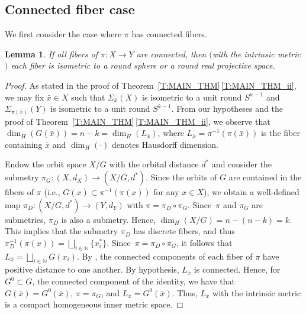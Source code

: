 \documentclass[10pt,a4paper]{amsart}
\numberwithin{equation}{section}
\newtheorem{lem}[thm]{Lemma}
\theoremstyle{definition}
\newcommand{\N}{\mathbb{N}} %
\begin{document}
\subsection*{Connected fiber case} We first consider the case where $\pi$ has connected fibers.

\begin{lem}\label{L: fibers are homogeneous Riemannian manifolds}
If all fibers of $\pi\colon X\to Y$ are connected, then $($with the intrinsic metric$)$ each fiber is isometric to a round sphere or a round real projective space.
\end{lem}

\begin{proof}

As stated in the proof of Theorem~\ref{T:MAIN_THM}\,\ref{T:MAIN_THM_ii}, we may fix $\bar{x}\in X$ such that $\Sigma_{\bar{x}}(X)$ is isometric to a unit round $S^{n-1}$ and $\Sigma_{\pi(\bar{x})}(Y)$ is isometric to a unit round $S^{k-1}$.
From our hypotheses and the proof of Theorem~\ref{T:MAIN_THM}\,\ref{T:MAIN_THM_ii}, we observe that
$
\dim_H(G(\bar{x})) = n-k = \dim_H(L_{\bar{x}})$,
where $L_{\bar{x}} = \pi^{-1}(\pi(\bar{x}))$ is the fiber containing $\bar{x}$ and $\dim_H(\cdot)$ denotes Hausdorff dimension.

Endow the orbit space $X/G$ with the orbital distance $d^\ast$ and consider the submetry
$
\pi_G\colon (X,\allowbreak d_X)\to (X/G,d^\ast)$.
Since the orbits of $G$ are contained in the fibers of $\pi$ \big(i.e., $G(x)\subset \pi^{-1}(\pi(x))$ for any $x\in X$\big), we obtain a well-defined map
$\pi_D\colon (X/G,d^\ast)\to (Y,d_Y)$
with $\pi = \pi_D\circ \pi_G$. Since~$\pi$ and $\pi_G$ are submetries, $\pi_D$ is also a submetry.
Hence,
$\dim_H(X/G) = n-(n-k) = k$.
This implies that the submetry $\pi_D$ has discrete fibers, and thus $\pi_D^{-1}(\pi(x))= \bigsqcup_{i\in \N} \{x^\ast_i\}$. Since~${\pi = \pi_D\circ \pi_G}$, it follows that
$
L_{\bar{x}} = \bigsqcup_{i\in \N} G(x_{i})$.
By \cite[Theorem 7.2]{Lytchak}, the connected components of each fiber of $\pi$ have positive distance to one another.
By hypothesis, $L_{\bar{x}}$ is connected. Hence, for $G^0\subset G$, the connected component of the identity, we have that $G(\bar{x})=G^0(\bar{x})$, $\pi=\pi_G$, and
$
L_{\bar{x}}=G^0(\bar{x})$.
Thus, $L_{\bar{x}}$ with the intrinsic metric is a compact homogeneous inner metric space.


\end{proof}
\end{document}
